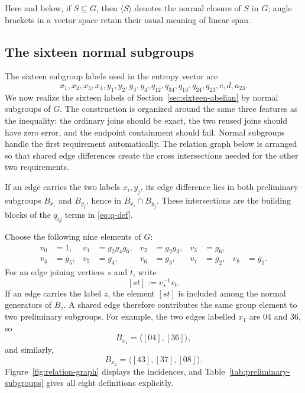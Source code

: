 \documentclass[journal]{IEEEtran}
\begin{document}
Here and below, if $S\subseteq G$, then $\langle S\rangle$ denotes the normal
closure of $S$ in $G$; angle brackets in a vector
space retain their usual meaning of linear span.

\subsection{The sixteen normal subgroups}\label{sec:sixteen-subgroups}
The sixteen subgroup labels used in the entropy vector are
\[
 x_1,x_2,x_3,x_4,y_1,y_2,y_3,y_4,
 q_{12},q_{34},q_{13},q_{24},q_{23},c,d,a_{23}.
\]
We now realize the sixteen labels of Section~\ref{sec:sixteen-abelian} by
normal subgroups of $G$.  The construction is organized around the same three
features as the inequality: the ordinary joins should be exact, the two reused
joins should have zero error, and the endpoint containment should fail.  Normal
subgroups handle the first requirement automatically.  The relation graph
below is arranged so that shared edge differences create the cross
intersections needed for the other two requirements.

If an edge carries the two labels $x_i,y_j$, its edge difference lies in both
preliminary subgroups $B_{x_i}$ and $B_{y_j}$, hence in
$B_{x_i}\cap B_{y_j}$.  These intersections are the building blocks of the
$q_{ij}$ terms in \eqref{eq:q-def}.

Choose the following nine elements of $G$:
\begin{equation}\label{eq:vertices}
\begin{aligned}
 v_0&=1,&v_1&=g_2g_4g_6,&v_2&=g_2g_3,&v_3&=g_6,\\
 v_4&=g_5,&v_5&=g_4,&v_6&=g_3,&v_7&=g_2,&v_8&=g_1.
\end{aligned}
\end{equation}
For an edge joining vertices $s$ and $t$, write
\[
   [st]:=v_s^{-1}v_t.
\]
If an edge carries the label $z$, the element $[st]$ is included among the
normal generators of $B_z$.  A shared edge therefore contributes the same
group element to two preliminary subgroups.  For example, the two edges
labelled $x_1$ are $04$ and $36$, so
\[
   B_{x_1}=\langle[04],[36]\rangle,
\]
and similarly,
\[
   B_{x_2}=\langle[43],[37],[08]\rangle.
\]
Figure~\ref{fig:relation-graph} displays the incidences, and
Table~\ref{tab:preliminary-subgroups} gives all eight definitions explicitly.
\end{document}
